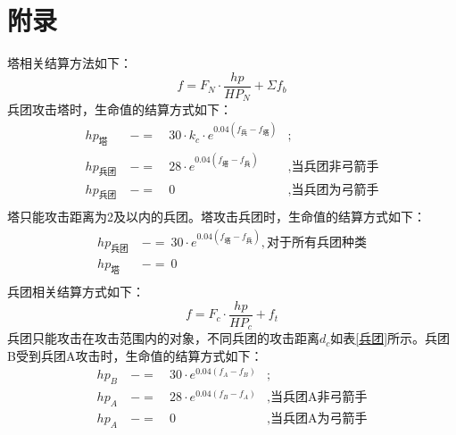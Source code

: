 \documentclass[a4paper,4pt]{article}
\begin{document}
\section{附录}
塔相关结算方法如下：
\begin{equation}
  f = F_N \cdot \frac{hp}{HP_N} + \Sigma f_b\label{f}
\end{equation}
兵团攻击塔时，生命值的结算方式如下：
\begin{equation}
  \begin{aligned}
    hp_{\text{塔}}   & \ -= & \ 30 \cdot k_c \cdot e^{0.04(f_{\text{兵}}-f_{\text{塔}})} & ;                       \\
    hp_{\text{兵团}} & \ -= & \ 28 \cdot e^{0.04(f_{\text{塔}}-f_{\text{兵}})}           & , \text{当兵团非弓箭手} \\
    hp_{\text{兵团}} & \ -= & \ 0                                                        & , \text{当兵团为弓箭手} \\
  \end{aligned}
  \label{hp1}
\end{equation}
塔只能攻击距离为2及以内的兵团。塔攻击兵团时，生命值的结算方式如下：
\begin{equation}
  \begin{aligned}
    hp_{\text{兵团}} & \ -=\ 30 \cdot e^{0.04(f_{\text{塔}}-f_{\text{兵}})}, \text{对于所有兵团种类} \\
    hp_{\text{塔}}   & \ -=\ 0                                                                       \\
  \end{aligned}
  \label{hp2}
\end{equation}
兵团相关结算方式如下：
\begin{equation}
  f = F_c \cdot \frac{hp}{HP_c} + f_t\label{f2}
\end{equation}
兵团只能攻击在攻击范围内的对象，不同兵团的攻击距离$d_c$如表\ref{兵团}所示。兵团B受到兵团A攻击时，生命值的结算方式如下：
\begin{equation}
  \begin{aligned}
    hp_{B} & \ -= & \ 30 \cdot e^{0.04(f_{A}-f_{B})} & ;                        \\
    hp_{A} & \ -= & \ 28 \cdot e^{0.04(f_{B}-f_{A})} & , \text{当兵团A非弓箭手} \\
    hp_{A} & \ -= & \ 0                              & , \text{当兵团A为弓箭手} \\
  \end{aligned}
  \label{hp2}
\end{equation}\par
\end{document}

